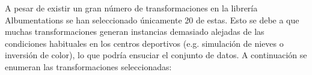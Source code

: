\documentclass[12pt]{report} %
\begin{document}

    A pesar de existir un gran número de transformaciones en la librería
    Albumentations se han seleccionado únicamente 20 de estas. Esto se debe a
    que muchas transformaciones generan instancias demasiado alejadas de las
    condiciones habituales en los centros deportivos (e.g. simulación de nieves
    o inversión de color), lo que podría ensuciar el conjunto de datos. A
    continuación se enumeran las transformaciones seleccionadas:
\end{document}
